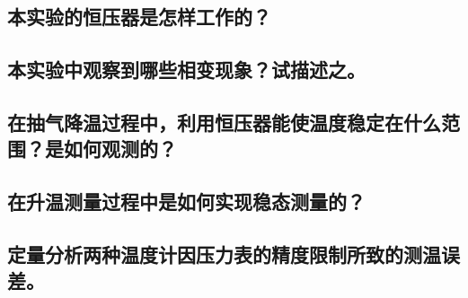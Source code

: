 \documentclass[a4paper]{article}
\begin{document}
\subsection{本实验的恒压器是怎样工作的？}
\subsection{本实验中观察到哪些相变现象？试描述之。}
\subsection{在抽气降温过程中，利用恒压器能使温度稳定在什么范围？是如何观测的？}
\subsection{在升温测量过程中是如何实现稳态测量的？}
\subsection{定量分析两种温度计因压力表的精度限制所致的测温误差。}

\nocite{jiaocai}

\end{document}
